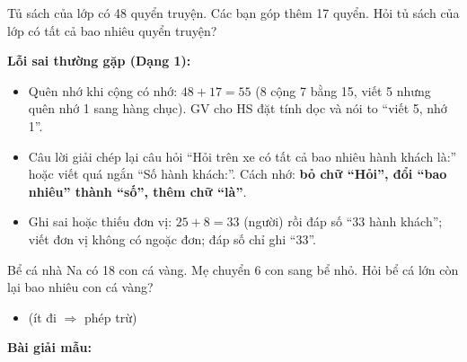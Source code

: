 \documentclass[../main.tex]{subfiles}
\begin{document}
\begin{bt}
Tủ sách của lớp có 48 quyển truyện. Các bạn góp thêm 17 quyển. Hỏi tủ sách của lớp có tất cả bao nhiêu quyển truyện?
\end{bt}
\begin{luuy}
    \textbf{Lỗi sai thường gặp (Dạng 1):}
    \begin{itemize}
        \item Quên nhớ khi cộng có nhớ: $48 + 17 = 55$ (8 cộng 7 bằng 15, viết 5 nhưng quên nhớ 1 sang hàng chục). GV cho HS đặt tính dọc và nói to “viết 5, nhớ 1”.
        \item Câu lời giải chép lại câu hỏi “Hỏi trên xe có tất cả bao nhiêu hành khách là:” hoặc viết quá ngắn “Số hành khách:”. Cách nhớ: \textbf{bỏ chữ “Hỏi”, đổi “bao nhiêu” thành “số”, thêm chữ “là”}.
        \item Ghi sai hoặc thiếu đơn vị: $25 + 8 = 33$ (người) rồi đáp số “33 hành khách”; viết đơn vị không có ngoặc đơn; đáp số chỉ ghi “33”.
    \end{itemize}
\end{luuy}
\begin{vd}
    Bể cá nhà Na có 18 con cá vàng. Mẹ chuyển 6 con sang bể nhỏ. Hỏi bể cá lớn còn lại bao nhiêu con cá vàng?
\end{vd}
\begin{itemize}
    \item {} \hfill (ít đi $\Rightarrow$ phép trừ)
\end{itemize}
\textbf{Bài giải mẫu:}
\end{document}
